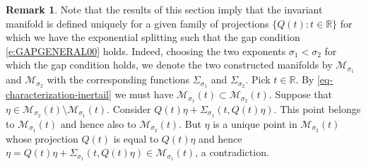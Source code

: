 \documentclass[a4paper,11pt,reqno]{amsart}
\theoremstyle{plain}
\newtheorem{prop}[lem]{Proposition}
\theoremstyle{definition}
\newtheorem{rem}[lem]{Remark}
\numberwithin{equation}{section}
\newcommand{\R}{\mathbb{R}}
\newcommand{\calm}{\mathcal M}
\renewcommand{\leq}{\leqslant}
\begin{document}
\begin{rem}
Note that the results of this section imply that the invariant manifold is defined uniquely for a given family of projections $\{Q(t)\colon t\in \R\}$ for which we have the exponential splitting such that the gap condition \eqref{e:GAPGENERAL00} holds. Indeed, choosing the two exponents $\sigma_1<\sigma_2$ for which the gap condition holds, we denote the two constructed manifolds by $\calm_{\sigma_1}$ and $\calm_{\sigma_2}$ with the corresponding functions $\Sigma_{\sigma_1}$ and $\Sigma_{\sigma_2}$. Pick $t\in \R$. By \eqref{eq-characterization-inertail} we must have $\calm_{\sigma_1}(t)\subset \calm_{\sigma_2}(t)$. Suppose that $\eta \in \calm_{\sigma_2}(t) \setminus  \calm_{\sigma_1}(t)$. Consider $Q(t)\eta+\Sigma_{\sigma_1}(t,Q(t)\eta)$. This point belongs to $\calm_{\sigma_1}(t)$ and hence also to  $\calm_{\sigma_2}(t)$. But $\eta$ is a unique point in $\calm_{\sigma_2}(t)$ whose projection $Q(t)$ is equal to $Q(t)\eta$ and hence $\eta = Q(t)\eta+\Sigma_{\sigma_1}(t,Q(t)\eta) \in \calm_{\sigma_1}(t)$, a contradiction.
\end{rem}
\end{document}
